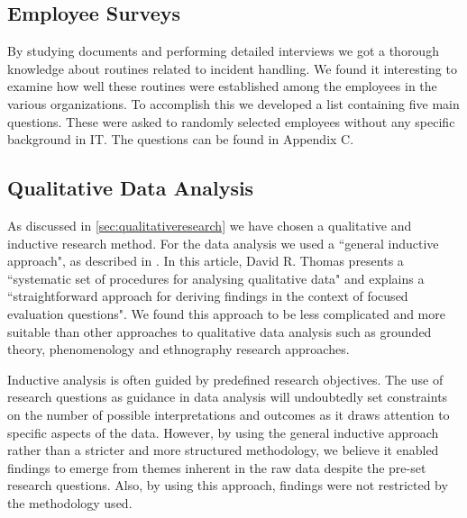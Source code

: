 \subsection{Employee Surveys}
\label{sec:employeeSurveys}
By studying documents and performing detailed interviews we got a thorough knowledge about routines related to incident handling. We found it interesting to examine how well these routines were established among the employees in the various organizations. To accomplish this we developed a list containing five main questions. These were asked to randomly selected employees without any specific background in IT. The questions can be found in Appendix C.
 

\subsection{Qualitative Data Analysis}
\label{sec:qualitativeAnalysis}
As discussed in \ref{sec:qualitativeresearch} we have chosen a qualitative and inductive research method. For the data analysis we used a ``general inductive approach", as described in \cite{thomas2006general}. In this article, David R. Thomas presents a ``systematic set of procedures for analysing qualitative data" and explains a ``straightforward approach for deriving findings in the context of focused evaluation questions". We found this approach to be less complicated and more suitable than other approaches to qualitative data analysis such as grounded theory, phenomenology and ethnography research approaches\cite{thorne2000data}.

Inductive analysis is often guided by predefined research objectives. The use of research questions as guidance in data analysis will undoubtedly set constraints on the number of possible interpretations and outcomes as it draws attention to specific aspects of the data. However, by using the general inductive approach rather than a stricter and more structured methodology, we believe it enabled findings to emerge from themes inherent in the raw data despite the pre-set research questions. Also, by using this approach, findings were not restricted by the methodology used. 

